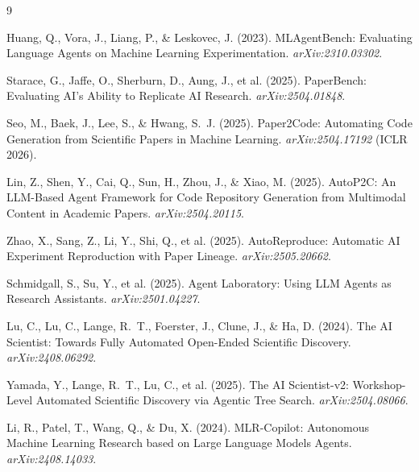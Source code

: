 \documentclass[11pt]{article}
\begin{document}

\begin{thebibliography}{9}

Huang, Q., Vora, J., Liang, P., \& Leskovec, J. (2023).
MLAgentBench: Evaluating Language Agents on Machine Learning Experimentation.
\textit{arXiv:2310.03302}.

Starace, G., Jaffe, O., Sherburn, D., Aung, J., et al. (2025).
PaperBench: Evaluating AI's Ability to Replicate AI Research.
\textit{arXiv:2504.01848}.

Seo, M., Baek, J., Lee, S., \& Hwang, S.~J. (2025).
Paper2Code: Automating Code Generation from Scientific Papers in Machine Learning.
\textit{arXiv:2504.17192} (ICLR 2026).

Lin, Z., Shen, Y., Cai, Q., Sun, H., Zhou, J., \& Xiao, M. (2025).
AutoP2C: An LLM-Based Agent Framework for Code Repository Generation from Multimodal
Content in Academic Papers.
\textit{arXiv:2504.20115}.

Zhao, X., Sang, Z., Li, Y., Shi, Q., et al. (2025).
AutoReproduce: Automatic AI Experiment Reproduction with Paper Lineage.
\textit{arXiv:2505.20662}.

Schmidgall, S., Su, Y., et al. (2025).
Agent Laboratory: Using LLM Agents as Research Assistants.
\textit{arXiv:2501.04227}.

Lu, C., Lu, C., Lange, R.~T., Foerster, J., Clune, J., \& Ha, D. (2024).
The AI Scientist: Towards Fully Automated Open-Ended Scientific Discovery.
\textit{arXiv:2408.06292}.

Yamada, Y., Lange, R.~T., Lu, C., et al. (2025).
The AI Scientist-v2: Workshop-Level Automated Scientific Discovery via Agentic Tree
Search.
\textit{arXiv:2504.08066}.

Li, R., Patel, T., Wang, Q., \& Du, X. (2024).
MLR-Copilot: Autonomous Machine Learning Research based on Large Language Models Agents.
\textit{arXiv:2408.14033}.

\end{thebibliography}
\end{document}
